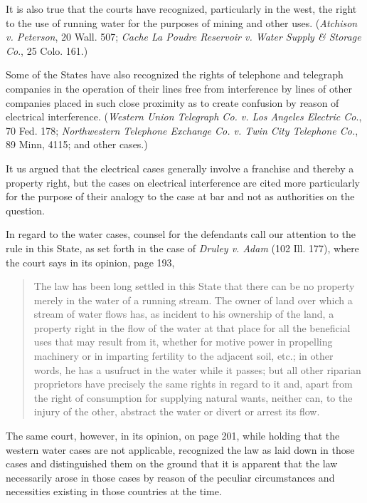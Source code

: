 It is also true that the courts have recognized, particularly in the west, the
right to the use of running water for the purposes of mining and other uses.
(\textit{Atchison v. Peterson}, 20 Wall. 507; \textit{Cache La Poudre Reservoir
v. Water Supply \& Storage Co}., 25 Colo. 161.)

Some of the States have also recognized the rights of telephone and telegraph
companies in the operation of their lines free from interference by lines of
other companies placed in such close proximity as to create confusion by reason
of electrical interference. (\textit{Western Union Telegraph Co. v. Los Angeles
Electric Co}., 70 Fed. 178; \textit{Northwestern Telephone Exchange Co. v.
Twin City Telephone Co.}, 89 Minn, 4115; and other cases.)

It us argued that the electrical cases generally involve a franchise
and thereby a property right, but the cases on electrical interference are
cited more particularly for the purpose of their analogy to the case at bar and
not as authorities on the question.

In regard to the water cases, counsel for the defendants call our attention to
the rule in this State, as set forth in the case of \textit{Druley v. Adam}
(102 Ill. 177), where the court says in its opinion, page 193,
\begin{quote}
The law has
been long settled in this State that there can be no property merely in the
water of a running stream. The owner of land over which a stream of water flows
has, as incident to his ownership of the land, a property right in the flow of
the water at that place for all the beneficial uses that may result from it,
whether for motive power in propelling machinery or in imparting fertility to
the adjacent soil, etc.; in other words, he has a usufruct in the water
while it passes; but all other riparian proprietors have precisely the same
rights in regard to it and, apart from the right of consumption for supplying
natural wants, neither can, to the injury of the other, abstract the water or
divert or arrest its flow.
\end{quote}
The same court, however, in its opinion, on page 201, while holding that the
western water cases are not applicable, recognized the law as laid down in
those cases and distinguished them on the ground that it is apparent that the
law necessarily arose in those cases by reason of the peculiar circumstances
and necessities existing in those countries at the time.

